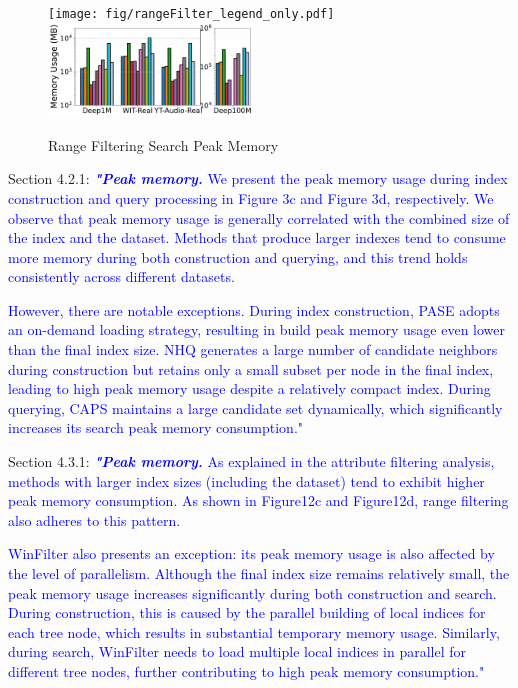 \documentclass[sigconf, nonacm]{acmart}
\begin{document}
\begin{figure}[htbp]
	\centering
	\texttt{[image: fig/rangeFilter\_legend\_only.pdf]}
	\includegraphics[height=2.5cm]{fig/searchMem/range_memory_comparison.pdf}
	\caption{Range Filtering Search Peak Memory}
	\label{fig:rangeFilter_search_memory_mb}
\end{figure}


Section 4.2.1:
\textcolor{blue}{\textit{\textbf{"Peak memory.}}	
	We present the peak memory usage during index construction and query processing in Figure 3c and Figure 3d, respectively. We observe that peak memory usage is generally correlated with the combined size of the index and the dataset. Methods that produce larger indexes tend to consume more memory during both construction and querying, and this trend holds consistently across different datasets.}

\textcolor{blue}{However, there are notable exceptions. During index construction, PASE adopts an on-demand loading strategy, resulting in build peak memory usage even lower than the final index size. NHQ generates a large number of candidate neighbors during construction but retains only a small subset per node in the final index, leading to high peak memory usage despite a relatively compact index.
During querying, CAPS maintains a large candidate set dynamically, which significantly increases its search peak memory consumption."}

 Section 4.3.1:
\textcolor{blue}{\textit{\textbf{"Peak memory.}}  
	As explained in the attribute filtering analysis, methods with larger index sizes (including the dataset) tend to exhibit higher peak memory consumption. As shown in Figure12c and Figure12d, range filtering also adheres to this pattern.}  

	
	\textcolor{blue}{WinFilter also presents an exception:  its peak memory usage is also affected by the level of parallelism. Although the final index size remains relatively small, the peak memory usage increases significantly during both construction and search. During construction, this is caused by the parallel building of local indices for each tree node, which results in substantial temporary memory usage. Similarly, during search, WinFilter needs to load multiple local indices in parallel for different tree nodes, further contributing to high peak memory consumption."}
\end{document}
